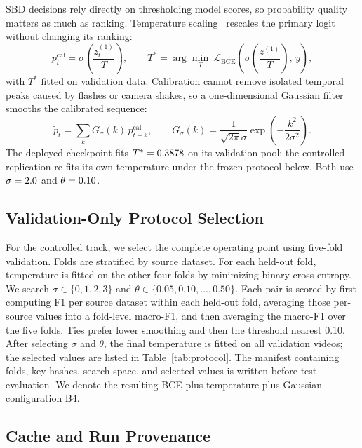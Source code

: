 SBD decisions rely directly on thresholding model scores, so probability
quality matters as much as ranking. Temperature
scaling~\cite{guo2017calibration} rescales the primary logit without
changing its ranking:
\begin{equation}
    p^{\mathrm{cal}}_t=\sigma\!\left(\frac{z^{(1)}_t}{T}\right),\qquad
    T^{*}=\arg\min_{T}\ \mathcal{L}_{\mathrm{BCE}}\!\left(\sigma\!\left(\frac{z^{(1)}}{T}\right),\,y\right),
    \label{eq:temperature}
\end{equation}
with $T^{*}$ fitted on validation data. Calibration cannot remove isolated
temporal peaks caused by flashes or camera shakes, so a one-dimensional
Gaussian filter smooths the calibrated sequence:
\begin{equation}
    \tilde p_t=\sum_k G_{\sigma}(k)\,p^{\mathrm{cal}}_{t-k},\qquad
    G_{\sigma}(k)=\frac{1}{\sqrt{2\pi}\sigma}\exp\!\left(-\frac{k^2}{2\sigma^2}\right).
    \label{eq:gaussian}
\end{equation}
The deployed checkpoint fits $T^{*}=0.3878$ on its
validation pool; the controlled replication re-fits its own temperature
under the frozen protocol below. Both use $\sigma=2.0$ and
$\theta=0.10$.

\subsection{Validation-Only Protocol Selection}
\label{sec:protocol}

For the controlled track, we select the complete operating point using
five-fold validation. Folds are stratified by source dataset. For each
held-out fold, temperature is fitted on the other four folds by minimizing
binary cross-entropy. We search $\sigma\in\{0,1,2,3\}$ and
$\theta\in\{0.05,0.10,\ldots,0.50\}$. Each pair is scored by first computing
F1 per source dataset within each held-out fold, averaging those per-source
values into a fold-level macro-F1, and then averaging the macro-F1 over the
five folds. Ties prefer lower smoothing and then the threshold nearest 0.10.
After selecting $\sigma$ and $\theta$, the final temperature is fitted on
all validation videos; the selected values are listed in
Table~\ref{tab:protocol}. The manifest containing folds, key hashes, search
space, and selected values is written before test evaluation. We denote the
resulting BCE plus temperature plus Gaussian configuration B4.

\subsection{Cache and Run Provenance}

